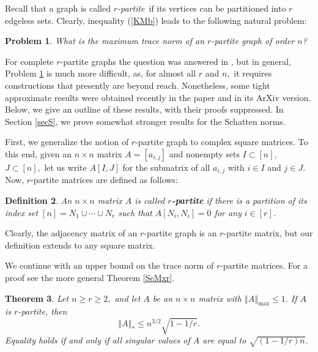 \documentclass[12pt]{article}%
\newtheorem{theorem}{Theorem}[section]
\newtheorem{definition}[theorem]{Definition}
\newtheorem{problem}[theorem]{Problem}
\begin{document}
Recall that a graph is called $r$\emph{-partite}\ if its vertices can be
partitioned into $r$ edgeless sets. Clearly, inequality (\ref{KMb}) leads to
the following natural problem:

\begin{problem}
\label{pr}What is the maximum trace norm of an $r$-partite graph of order $n$?
\end{problem}

For complete $r$-partite graphs the question was answered in \cite{CCGH99},
but in general, Problem \ref{pr} is much more difficult, as, for almost all
$r$ and $n,$ it requires constructions that presently are beyond reach.
Nonetheless, some tight approximate results were obtained recently in the
paper \cite{Nik15a} and in its ArXiv version. Below, we give an outline of
these results, with their proofs suppressed. In Section \ref{secS}, we prove
somewhat stronger results for the Schatten norms.\medskip

First, we generalize the notion of $r$-partite graph to complex square
matrices. To this end, given an $n\times n$ matrix $A=\left[  a_{i,j}\right]
$ and nonempty sets $I\subset\left[  n\right]  ,$ $J\subset\left[  n\right]
,$ let us write $A\left[  I,J\right]  $ for the submatrix of all $a_{i,j}$
with $i\in I$ and $j\in J.$ Now, $r$-partite matrices are defined as follows:\ 

\begin{definition}
An $n\times n$ matrix $A$ is called $r$\textbf{-partite} if there is a
partition of its index set $\left[  n\right]  =N_{1}\cup\cdots\cup N_{r}$ such
that $A\left[  N_{i},N_{i}\right]  =0$ for any $i\in\left[  r\right]  $.
\end{definition}

Clearly, the adjacency matrix of an $r$-partite graph is an $r$-partite
matrix, but our definition extends to any square matrix.\medskip

We continue with an upper bound on the trace norm of $r$-partite matrices. For
a proof see the more general Theorem \ref{ScMxr}.

\begin{theorem}
\label{thMxr}Let $n\geq r\geq2,$ and let $A$ be an $n\times n$ matrix with
$\left\Vert A\right\Vert _{\max}\leq1.$ If $A$ is $r$-partite, then
\begin{equation}
\left\Vert A\right\Vert _{\ast}\leq n^{3/2}\sqrt{1-1/r}.\label{Mb}%
\end{equation}
Equality holds if and only if all singular values of $A$ are equal to
$\sqrt{\left(  1-1/r\right)  n}$.
\end{theorem}
\end{document}
